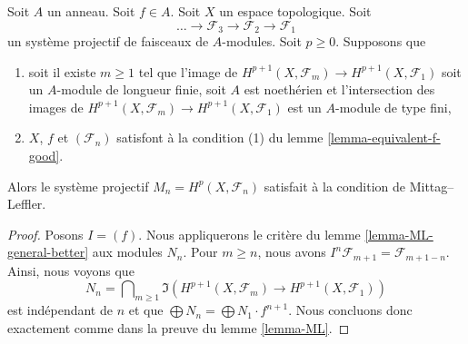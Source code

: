 \begin{lemma}

\label{lemma-ML-better}

Soit $A$ un anneau. Soit $f \in A$. Soit $X$ un espace topologique. Soit
$$
\ldots \to \mathcal{F}_3 \to \mathcal{F}_2 \to \mathcal{F}_1
$$
un système projectif de faisceaux de $A$-modules. Soit $p \geq 0$. Supposons que

\begin{enumerate}

\item soit il existe $m \geq 1$ tel que l'image de
$H^{p + 1}(X, \mathcal{F}_m) \to H^{p + 1}(X, \mathcal{F}_1)$
soit un $A$-module de longueur finie, soit $A$ est noethérien et l'intersection des images de
$H^{p + 1}(X, \mathcal{F}_m) \to H^{p + 1}(X, \mathcal{F}_1)$
est un $A$-module de type fini,
\item $X$, $f$ et $(\mathcal{F}_n)$ satisfont à la condition (1) du lemme \ref{lemma-equivalent-f-good}.

\end{enumerate}

Alors le système projectif $M_n = H^p(X, \mathcal{F}_n)$ satisfait à la condition de Mittag--Leffler.

\end{lemma}

\begin{proof}
Posons $I = (f)$. Nous appliquerons le critère du lemme \ref{lemma-ML-general-better} aux modules $N_n$. Pour $m \geq n$, nous avons
$I^n\mathcal{F}_{m + 1} = \mathcal{F}_{m + 1 - n}$. Ainsi, nous voyons que
$$
N_n = \bigcap\nolimits_{m \geq 1} \Im\left(
H^{p + 1}(X, \mathcal{F}_m) \to H^{p + 1}(X, \mathcal{F}_1)
\right)
$$
est indépendant de $n$ et que $\bigoplus N_n = \bigoplus N_1 \cdot f^{n + 1}$. Nous concluons donc exactement comme dans la preuve du lemme \ref{lemma-ML}.
\end{proof}

